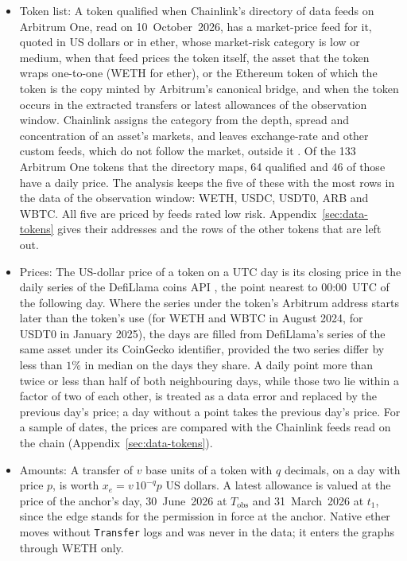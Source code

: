 \begin{itemize}
\item Token list: A token qualified when Chainlink's directory of data feeds on Arbitrum One, read on 10~October~2026, has a market-price feed for it, quoted in US dollars or in ether, whose market-risk category is low or medium, when that feed prices the token itself, the asset that the token wraps one-to-one (WETH for ether), or the Ethereum token of which the token is the copy minted by Arbitrum's canonical bridge, and when the token occurs in the extracted transfers or latest allowances of the observation window. Chainlink assigns the category from the depth, spread and concentration of an asset's markets, and leaves exchange-rate and other custom feeds, which do not follow the market, outside it \parencite{chainlinknddatafeeds}. Of the 133 Arbitrum One tokens that the directory maps, 64 qualified and 46 of those have a daily price. The analysis keeps the five of these with the most rows in the data of the observation window: WETH, USDC, USDT0, ARB and WBTC. All five are priced by feeds rated low risk. Appendix~\ref{sec:data-tokens} gives their addresses and the rows of the other tokens that are left out.
\item Prices: The US-dollar price of a token on a UTC day is its closing price in the daily series of the DefiLlama coins API \parencite{defillamanddocs}, the point nearest to 00:00~UTC of the following day. Where the series under the token's Arbitrum address starts later than the token's use (for WETH and WBTC in August 2024, for USDT0 in January 2025), the days are filled from DefiLlama's series of the same asset under its CoinGecko identifier, provided the two series differ by less than $1\%$ in median on the days they share. A daily point more than twice or less than half of both neighbouring days, while those two lie within a factor of two of each other, is treated as a data error and replaced by the previous day's price; a day without a point takes the previous day's price. For a sample of dates, the prices are compared with the Chainlink feeds read on the chain (Appendix~\ref{sec:data-tokens}).
\item Amounts: A transfer of $v$ base units of a token with $q$ decimals, on a day with price $p$, is worth $x_e=v\,10^{-q}p$ US dollars. A latest allowance is valued at the price of the anchor's day, 30~June~2026 at $T_{\mathrm{obs}}$ and 31~March~2026 at $t_1$, since the edge stands for the permission in force at the anchor. Native ether moves without \texttt{Transfer} logs and was never in the data; it enters the graphs through WETH only.

\end{itemize}
